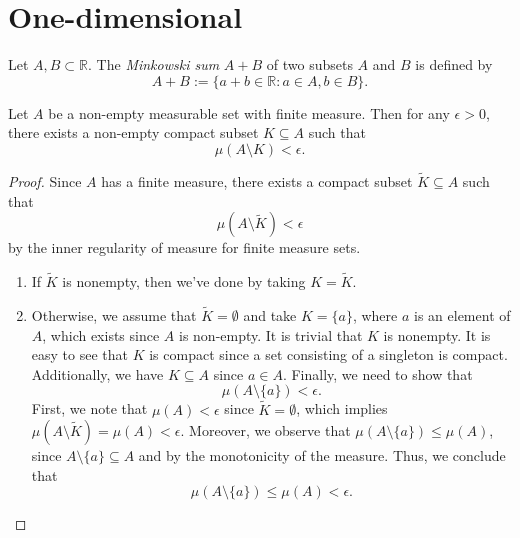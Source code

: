 \section{One-dimensional}

\begin{definition}
    Let \(A, B \subset \mathbb{R}\). The \textit{Minkowski sum} \(A+B\) of two subsets \(A\) and \(B\) is defined by
    \begin{equation*}
        A+B:= \{a+b\in\mathbb{R} : a \in A, b \in B\}.
    \end{equation*}
\end{definition}

\begin{lemma}
    Let \(A\) be a non-empty measurable set with finite measure. 
    Then for any \(\epsilon > 0\), there exists a non-empty compact subset \(K \subseteq A\) such that 
    \begin{equation*}
        \mu(A \setminus K) < \epsilon.
    \end{equation*}
    \label{lemma: exists_isCompact_Nonempty_diff_lt}
\end{lemma}

\begin{proof}
    Since \(A\) has a finite measure, there exists a compact subset \(\widetilde{K} \subseteq A\) such that 
    \begin{equation*}
        \mu (A \setminus \widetilde{K}) < \epsilon
    \end{equation*}
    by the inner regularity of measure for finite measure sets.
    \begin{enumerate}
        \item If \(\widetilde{K}\) is nonempty, then we've done by taking \(K = \widetilde{K}\).
        \item Otherwise, we assume that \(\widetilde{K} = \emptyset\) and take \(K = \{a\}\), where \(a\) is an element of \(A\), which exists since \(A\) is non-empty. 
        It is trivial that \(K\) is nonempty. It is easy to see that \(K\) is compact since a set consisting of a singleton is compact.
        Additionally, we have \(K \subseteq A\) since \(a \in A\). Finally, we need to show that 
        \begin{equation*}
            \mu(A \setminus \{a\}) < \epsilon.
        \end{equation*}
        First, we note that \(\mu(A)<\epsilon\) since \(\widetilde{K} = \emptyset\), which implies \(\mu(A\setminus \widetilde{K}) = \mu(A) < \epsilon\).
        Moreover, we observe that \(\mu(A \setminus \{a\}) \leq \mu(A)\), since \(A\setminus \{a\} \subseteq A\) and by the monotonicity of the measure. 
        Thus, we conclude that
        \begin{equation*}
            \mu (A \setminus \{a\}) \leq \mu(A) < \epsilon.
        \end{equation*}
    \end{enumerate}
\end{proof}

